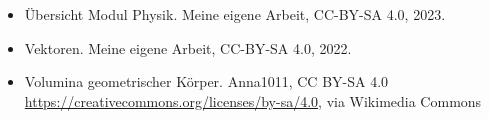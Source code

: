 \documentclass{beamer}
\begin{document}
\begin{frame}
\begin{tiny}
\begin{itemize}
\item
Übersicht Modul Physik. Meine eigene Arbeit, CC-BY-SA 4.0, 2023. 

\item
Vektoren. Meine eigene Arbeit, CC-BY-SA 4.0, 2022.

\item
Volumina geometrischer Körper. Anna1011, CC BY-SA 4.0 \url{https://creativecommons.org/licenses/by-sa/4.0}, via Wikimedia Commons

\end{itemize}

\end{tiny}
\end{frame}
\end{document}
